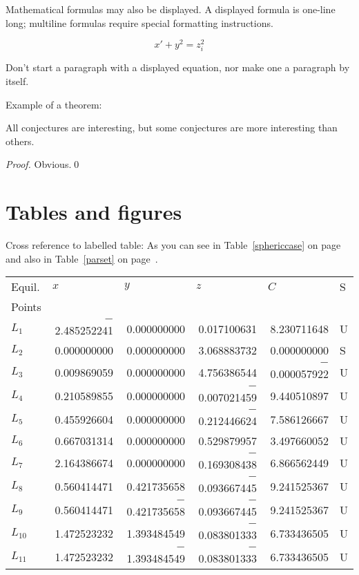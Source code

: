 \documentclass[fist]{svjour3}
\begin{document}
Mathematical formulas may also be displayed.  A displayed formula is
one-line long; multiline formulas require special formatting
instructions.

\[  
     x' + y^{2} = z_{i}^{2}
\]

Don't start a paragraph with a displayed equation, nor make
one a paragraph by itself.

Example of a theorem:


\begin{lemma}
All conjectures are interesting, but some conjectures are more
interesting than others.
\end{lemma}

\begin{proof}
Obvious.\qed
\end{proof}

\section{Tables and figures}
Cross reference to labelled table: As you can see in Table~\ref{sphericcase} on
page~\pageref{sphericcase} and also in Table~\ref{parset} on page~\pageref{parset}.


\begin{table*}
\caption{The spherical case ($I_1=0$, $I_2=0$)}
\label{sphericcase}
\begin{tabular*}{\textwidth}{@{\extracolsep{\fill}}lrrrrl@{}}
\hline
Equil. & \multicolumn{1}{l}{$x$} & \multicolumn{1}{l}{$y$} & \multicolumn{1}{l}{$z$} & \multicolumn{1}{l}{$C$} & S \\
Points \\
\hline
$L_1$ & $-$2.485252241 & 0.000000000 & 0.017100631 & 8.230711648 & U \\
$L_2$ &    0.000000000 & 0.000000000 & 3.068883732 & 0.000000000 & S \\
$L_3$ &    0.009869059 & 0.000000000 & 4.756386544 & $-$0.000057922 & U \\
$L_4$ &    0.210589855 & 0.000000000 & $-$0.007021459 & 9.440510897 & U \\
$L_5$ &    0.455926604 & 0.000000000 & $-$0.212446624 & 7.586126667 & U \\
$L_6$ &    0.667031314 & 0.000000000 & 0.529879957 & 3.497660052 & U \\
$L_7$ &    2.164386674 & 0.000000000 & $-$0.169308438 & 6.866562449 & U \\
$L_8$ &    0.560414471 & 0.421735658 & $-$0.093667445 & 9.241525367 & U \\
$L_9$ &    0.560414471 & $-$0.421735658 & $-$0.093667445 & 9.241525367 & U \\
$L_{10}$ & 1.472523232 & 1.393484549 & $-$0.083801333 & 6.733436505 & U \\
$L_{11}$ & 1.472523232 & $-$1.393484549 & $-$0.083801333 & 6.733436505 & U\\
\hline
\end{tabular*}
\end{table*}
\end{document}
